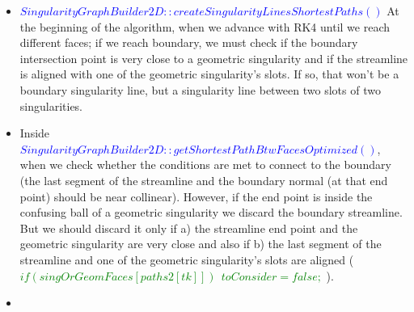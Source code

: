 \documentclass[a4paper]{report}
\begin{document}
{\begin{itemize}
if we have already detected streamlines, we must also mark them for the \textcolor{green}{$IllegalCross$} check (walk along the \textcolor{green}{$line_triangles$} and add them to \textcolor{green}{$isTraversedFaceCompVector$}).
\item \textcolor{blue}{$SingularityGraphBuilder2D::createSingularityLinesShortestPaths()$} 
\newline
At the beginning of the algorithm, when we advance with RK4 until we reach different faces; if we reach boundary, we must check if the boundary intersection point is very close to a geometric singularity and if the streamline is aligned with one of the geometric singularity's slots. If so, that won't be a boundary singularity line, but a singularity line between two slots of two singularities.
\item Inside \textcolor{blue}{$SingularityGraphBuilder2D::getShortestPathBtwFacesOptimized()$}, when we check whether the conditions are met to connect to the boundary (the last segment of the streamline and the boundary normal (at that end point) should be near collinear). However, if the end point is inside the confusing ball of a geometric singularity we discard the boundary streamline. But we should discard it only if a) the streamline end point and the geometric singularity are very close and also if b) the last segment of the streamline and one of the geometric singularity's slots are aligned (\textcolor{green}{$if(singOrGeomFaces[paths2[tk]])\ \ toConsider = false;$} ).
\item
\end{itemize}

}


\newpage
\end{document}
